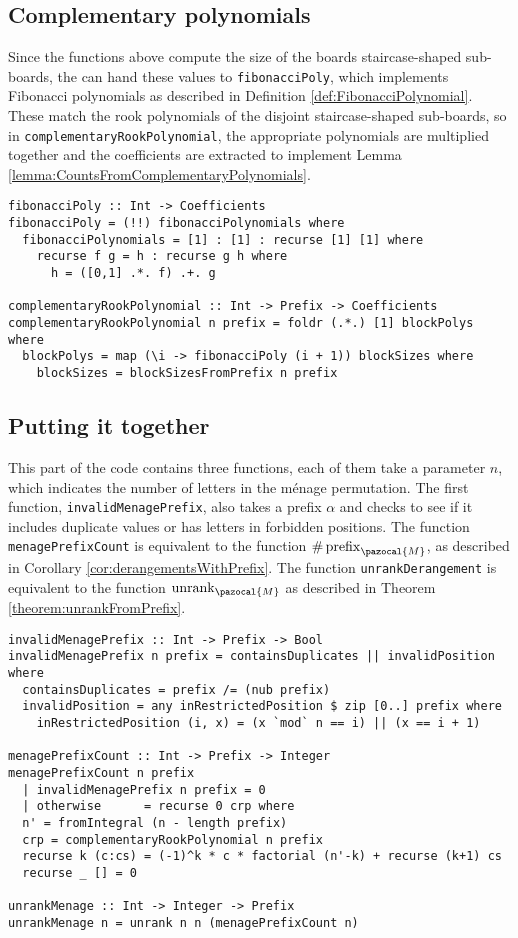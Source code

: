 \subsection{Complementary polynomials}
Since the functions above compute the size of the boards staircase-shaped
sub-boards, the can hand these values to \texttt{fibonacciPoly}, which
implements Fibonacci polynomials as described in
Definition \ref{def:FibonacciPolynomial}. These match the rook polynomials of
the disjoint staircase-shaped sub-boards, so in
\texttt{complementaryRookPolynomial}, the appropriate polynomials are multiplied
together and the coefficients are extracted to implement
Lemma \ref{lemma:CountsFromComplementaryPolynomials}.
\begin{singlespace}\begin{verbatim}
fibonacciPoly :: Int -> Coefficients
fibonacciPoly = (!!) fibonacciPolynomials where
  fibonacciPolynomials = [1] : [1] : recurse [1] [1] where
    recurse f g = h : recurse g h where
      h = ([0,1] .*. f) .+. g

complementaryRookPolynomial :: Int -> Prefix -> Coefficients
complementaryRookPolynomial n prefix = foldr (.*.) [1] blockPolys where
  blockPolys = map (\i -> fibonacciPoly (i + 1)) blockSizes where
    blockSizes = blockSizesFromPrefix n prefix
\end{verbatim}\end{singlespace}

\subsection{Putting it together}
This part of the code contains three functions, each of them take a parameter
$n$, which indicates the number of letters in the m\'enage permutation.
The first function, \texttt{invalidMenagePrefix}, also takes a prefix
$\alpha$ and checks to see if it includes duplicate values or has
letters in forbidden positions.
The function \texttt{menagePrefixCount}
is equivalent to the function $\#\operatorname{prefix}_\pazocal{M}$,
as described in Corollary \ref{cor:derangementsWithPrefix}.
The function \texttt{unrankDerangement} is equivalent to the function
$\operatorname{unrank}_\pazocal{M}$ as described in
Theorem \ref{theorem:unrankFromPrefix}.
\begin{singlespace}\begin{verbatim}
invalidMenagePrefix :: Int -> Prefix -> Bool
invalidMenagePrefix n prefix = containsDuplicates || invalidPosition where
  containsDuplicates = prefix /= (nub prefix)
  invalidPosition = any inRestrictedPosition $ zip [0..] prefix where
    inRestrictedPosition (i, x) = (x `mod` n == i) || (x == i + 1)

menagePrefixCount :: Int -> Prefix -> Integer
menagePrefixCount n prefix
  | invalidMenagePrefix n prefix = 0
  | otherwise      = recurse 0 crp where
  n' = fromIntegral (n - length prefix)
  crp = complementaryRookPolynomial n prefix
  recurse k (c:cs) = (-1)^k * c * factorial (n'-k) + recurse (k+1) cs
  recurse _ [] = 0

unrankMenage :: Int -> Integer -> Prefix
unrankMenage n = unrank n n (menagePrefixCount n)
\end{verbatim}\end{singlespace}

